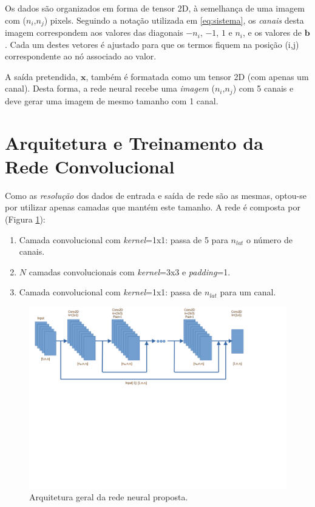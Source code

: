 \documentclass[final,5p]{elsarticle}
\numberwithin{equation}{section}
\begin{document}
    Os dados são organizados em forma de tensor 2D, à semelhança de uma imagem com ($n_i$,$n_j$) pixels. Seguindo a notação utilizada em \ref{eq:sistema}, os \emph{canais} desta imagem correspondem aos valores das diagonais $-n_i$, $-1$, $1$ e $n_i$, e os valores de $\textbf{b}$. Cada um destes vetores é ajustado para que os termos fiquem na posição (i,j) correspondente ao nó associado ao valor.

    A saída pretendida, $\textbf{x}$, também é formatada como um tensor 2D (com apenas um canal). Desta forma, a rede neural recebe uma \emph{imagem} ($n_i$,$n_j$) com 5 canais e deve gerar uma imagem de mesmo tamanho com 1 canal.

\section{Arquitetura e Treinamento da Rede Convolucional}

    Como as \emph{resolução} dos dados de entrada e saída de rede são as mesmas, optou-se por utilizar apenas camadas que mantém este tamanho. A rede é composta por (Figura \ref{fig:arquitetura}):

    \begin{enumerate}
        \item Camada convolucional com \emph{kernel}=1x1: passa de 5 para $n_{lat}$ o número de canais.
        \item $N$ camadas convolucionais com \emph{kernel}=3x3 e \emph{padding}=1.
        \item Camada convolucional com \emph{kernel}=1x1: passa de $n_{lat}$ para um canal.
    \end{enumerate}

    \begin{figure}[hbt!]
        \centering
        \includegraphics[width=0.95\columnwidth, trim={0cm 6cm 2cm 0cm}, clip]{./fig/NN.png}
        \caption{Arquitetura geral da rede neural proposta.}\label{fig:arquitetura}
    \end{figure}
\end{document}
